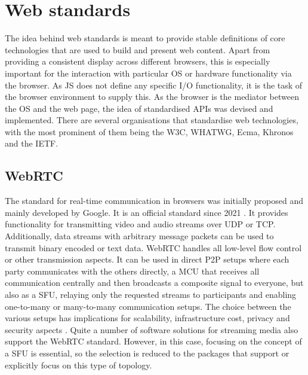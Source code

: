 \section{Web standards}
\label{section:webStandards}

The idea behind web standards is meant to provide stable definitions of core technologies that are used to build and present web content. Apart from providing a consistent display across different browsers, this is especially important for the interaction with particular \ac{OS} or hardware functionality via the browser. As \ac{JS} does not define any specific \ac{I/O} functionality, it is the task of the browser environment to supply this. As the browser is the mediator between the \ac{OS} and the web page, the idea of standardised \ac{API}s was devised and implemented. There are several organisations that standardise web technologies, with the most prominent of them being the \ac{W3C}, \ac{WHATWG}, Ecma, Khronos and the \ac{IETF}.

\subsection{WebRTC}

The standard for real-time communication in browsers was initially proposed and mainly developed by Google. It is an official standard since 2021 \parencite{webRtcOfficialWebStandard}. It provides functionality for transmitting video and audio streams over \ac{UDP} or \ac{TCP}. Additionally, data streams with arbitrary message packets can be used to transmit binary encoded or text data. WebRTC handles all low-level flow control or other transmission aspects. It can be used in direct \ac{P2P} setups where each party communicates with the others directly, a \ac{MCU} that receives all communication centrally and then broadcasts a composite signal to everyone, but also as a \ac{SFU}, relaying only the requested streams to participants and enabling one-to-many or many-to-many communication setups. The choice between the various setups has implications for scalability, infrastructure cost, privacy and security aspects \parencite{webRtcArchitectures}. Quite a number of software solutions for streaming media also support the WebRTC standard. However, in this case, focusing on the concept of a \ac{SFU} is essential, so the selection is reduced to the packages that support or explicitly focus on this type of topology.



